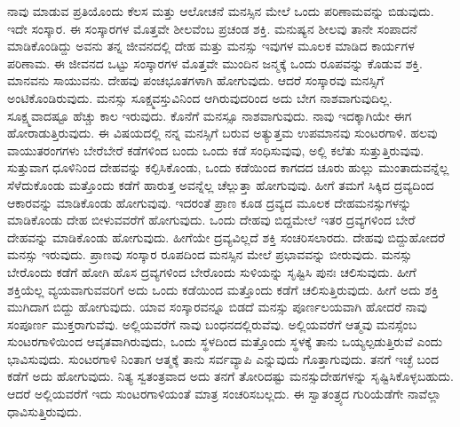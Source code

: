 ನಾವು ಮಾಡುವ ಪ್ರತಿಯೊಂದು ಕೆಲಸ ಮತ್ತು ಆಲೋಚನೆ ಮನಸ್ಸಿನ ಮೇಲೆ ಒಂದು ಪರಿಣಾಮವನ್ನು ಬಿಡುವುದು. ಇದೇ ಸಂಸ್ಕಾರ. ಈ ಸಂಸ್ಕಾರಗಳ ಮೊತ್ತವೇ ಶೀಲವೆಂಬ ಪ್ರಚಂಡ ಶಕ್ತಿ. ಮನುಷ್ಯನ ಶೀಲವು ತಾನೇ ಸಂಪಾದನೆ ಮಾಡಿಕೊಂಡಿದ್ದು ಅವನು ತನ್ನ ಜೀವನದಲ್ಲಿ ದೇಹ ಮತ್ತು ಮನಸ್ಸು ಇವುಗಳ ಮೂಲಕ ಮಾಡಿದ ಕಾರ್ಯಗಳ ಪರಿಣಾಮ. ಈ ಜೀವನದ ಒಟ್ಟು ಸಂಸ್ಕಾರಗಳ ಮೊತ್ತವೇ ಮುಂದಿನ ಜನ್ಮಕ್ಕೆ ಒಂದು ರೂಪವನ್ನು ಕೊಡುವ ಶಕ್ತಿ. ಮಾನವನು ಸಾಯುವನು. ದೇಹವು ಪಂಚಭೂತಗಳಾಗಿ ಹೋಗುವುದು. ಆದರೆ ಸಂಸ್ಕಾರವು ಮನಸ್ಸಿಗೆ ಅಂಟಿಕೊಂಡಿರುವುದು. ಮನಸ್ಸು ಸೂಕ್ಷ್ಮವಸ್ತುವಿನಿಂದ ಆಗಿರುವುದರಿಂದ ಅದು ಬೇಗ ನಾಶವಾಗುವುದಿಲ್ಲ. ಸೂಕ್ಷ್ಮವಾದಷ್ಟೂ ಹೆಚ್ಚು ಕಾಲ ಇರುವುದು. ಕೊನೆಗೆ ಮನಸ್ಸೂ ನಾಶವಾಗುವುದು. ನಾವು ಇದಕ್ಕಾಗಿಯೇ ಈಗ ಹೋರಾಡುತ್ತಿರುವುದು. ಈ ವಿಷಯದಲ್ಲಿ ನನ್ನ ಮನಸ್ಸಿಗೆ ಬರುವ ಅತ್ಯುತ್ತಮ ಉಪಮಾನವು ಸುಂಟರಗಾಳಿ. ಹಲವು ವಾಯುತರಂಗಗಳು ಬೇರೆಬೇರೆ ಕಡೆಗಳಿಂದ ಬಂದು ಒಂದು ಕಡೆ ಸಂಧಿಸುವುವು, ಅಲ್ಲಿ ಕಲೆತು ಸುತ್ತುತ್ತಿರುವುವು. ಸುತ್ತುವಾಗ ಧೂಳಿನಿಂದ ದೇಹವನ್ನು ಕಲ್ಪಿಸಿಕೊಂಡು, ಒಂದು ಕಡೆಯಿಂದ ಕಾಗದದ ಚೂರು ಹುಲ್ಲು ಮುಂತಾದುವನ್ನೆಲ್ಲ ಸೆಳೆದುಕೊಂಡು ಮತ್ತೊಂದು ಕಡೆಗೆ ಹಾರುತ್ತ ಅವನ್ನೆಲ್ಲ ಚೆಲ್ಲುತ್ತಾ ಹೋಗುವುವು. ಹೀಗೆ ತಮಗೆ ಸಿಕ್ಕಿದ ದ್ರವ್ಯದಿಂದ ಆಕಾರವನ್ನು ಮಾಡಿಕೊಂಡು ಹೋಗುವುವು. ಇದರಂತೆ ಪ್ರಾಣ ಕೂಡ ದ್ರವ್ಯದ ಮೂಲಕ ದೇಹಮನಸ್ಸುಗಳನ್ನು ಮಾಡಿಕೊಂಡು ದೇಹ ಬೀಳುವವರೆಗೆ ಹೋಗುವುದು. ಒಂದು ದೇಹವು ಬಿದ್ದಮೇಲೆ ಇತರ ದ್ರವ್ಯಗಳಿಂದ ಬೇರೆ ದೇಹವನ್ನು ಮಾಡಿಕೊಂಡು ಹೋಗುವುದು. ಹೀಗೆಯೇ ದ್ರವ್ಯವಿಲ್ಲದೆ ಶಕ್ತಿ ಸಂಚರಿಸಲಾರದು. ದೇಹವು ಬಿದ್ದುಹೋದರೆ ಮನಸ್ಸು ಇರುವುದು. ಪ್ರಾಣವು ಸಂಸ್ಕಾರ ರೂಪದಿಂದ ಮನಸ್ಸಿನ ಮೇಲೆ ಪ್ರಭಾವವನ್ನು ಬೀರುವುದು. ಮನಸ್ಸು ಬೇರೊಂದು ಕಡೆಗೆ ಹೋಗಿ ಹೊಸ ದ್ರವ್ಯಗಳಿಂದ ಬೇರೊಂದು ಸುಳಿಯನ್ನು ಸೃಷ್ಟಿಸಿ ಪುನಃ ಚಲಿಸುವುದು. ಹೀಗೆ ಶಕ್ತಿಯೆಲ್ಲ ವ್ಯಯವಾಗುವವರಿಗೆ ಅದು ಒಂದು ಕಡೆಯಿಂದ ಮತ್ತೊಂದು ಕಡೆಗೆ ಚಲಿಸುತ್ತಿರುವುದು. ಹೀಗೆ ಅದು ಶಕ್ತಿ ಮುಗಿದಾಗ ಬಿದ್ದು ಹೋಗುವುದು. ಯಾವ ಸಂಸ್ಕಾರವನ್ನೂ ಬಿಡದೆ ಮನಸ್ಸು ಪೂರ್ಣಲಯವಾಗಿ ಹೋದರೆ ನಾವು ಸಂಪೂರ್ಣ ಮುಕ್ತರಾಗುವೆವು. ಅಲ್ಲಿಯವರೆಗೆ ನಾವು ಬಂಧನದಲ್ಲಿರುವೆವು. ಅಲ್ಲಿಯವರೆಗೆ ಆತ್ಮವು ಮನಸ್ಸೆಂಬ ಸುಂಟರಗಾಳಿಯಿಂದ ಆವೃತವಾಗಿರುವುದು, ಒಂದು ಸ್ಥಳದಿಂದ ಮತ್ತೊಂದು ಸ್ಥಳಕ್ಕೆ ತಾನು ಒಯ್ಯಲ್ಪಡುತ್ತಿರುವೆ ಎಂದು ಭಾವಿಸುವುದು. ಸುಂಟರಗಾಳಿ ನಿಂತಾಗ ಆತ್ಮಕ್ಕೆ ತಾನು ಸರ್ವವ್ಯಾಪಿ ಎನ್ನುವುದು ಗೊತ್ತಾಗುವುದು. ತನಗೆ ಇಚ್ಛೆ ಬಂದ ಕಡೆಗೆ ಅದು ಹೋಗುವುದು. ನಿತ್ಯ ಸ್ವತಂತ್ರವಾದ ಅದು ತನಗೆ ತೋರಿದಷ್ಟು ಮನಸ್ಸು\break ದೇಹಗಳನ್ನು ಸೃಷ್ಟಿಸಿಕೊಳ್ಳಬಹುದು. ಆದರೆ ಅಲ್ಲಿಯವರೆಗೆ ಇದು ಸುಂಟರಗಾಳಿಯಂತೆ ಮಾತ್ರ ಸಂಚರಿಸಬಲ್ಲದು. ಈ ಸ್ವಾತಂತ್ರ್ಯದ ಗುರಿಯೆಡೆಗೇ ನಾವೆಲ್ಲಾ ಧಾವಿಸುತ್ತಿರುವುದು.


